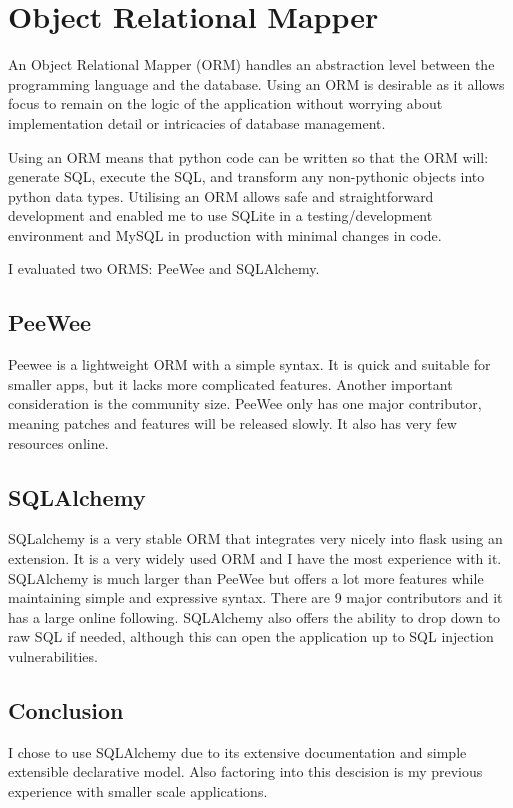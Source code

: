 \documentclass[a4paper,oneside,12pt]{report}
\begin{document}
	\section{Object Relational Mapper}
	An Object Relational Mapper (ORM) handles an abstraction level between the programming language and the database. Using an ORM is desirable as it allows focus to remain on the logic of the application without worrying about implementation detail or intricacies of database management.
	
	Using an ORM means that python code can be written so that the ORM will: generate SQL, execute the SQL, and transform any non-pythonic objects into python data types. Utilising an ORM allows safe and straightforward development and enabled me to use SQLite in a testing/development environment and MySQL in production with minimal changes in code.
	
	I evaluated two ORMS: PeeWee and SQLAlchemy.

	\subsection{PeeWee}
	Peewee is a lightweight ORM with a simple syntax. It is quick and suitable for smaller apps, but it lacks more complicated features. Another important consideration is the community size. PeeWee only has one major contributor, meaning patches and features will be released slowly. It also has very few resources online.

	\subsection{SQLAlchemy}
	SQLalchemy is a very stable ORM that integrates very nicely into flask using an extension. It is a very widely used ORM and I have the most experience with it. SQLAlchemy is much larger than PeeWee but offers a lot more features while maintaining simple and expressive syntax. There are 9 major contributors and it has a large online following. SQLAlchemy also offers the ability to drop down to raw SQL if needed, although this can open the application up to SQL injection vulnerabilities.
	
	\subsection{Conclusion}
	I chose to use SQLAlchemy due to its extensive documentation and simple extensible declarative model. Also factoring into this descision is my previous experience with smaller scale applications.
\end{document}
